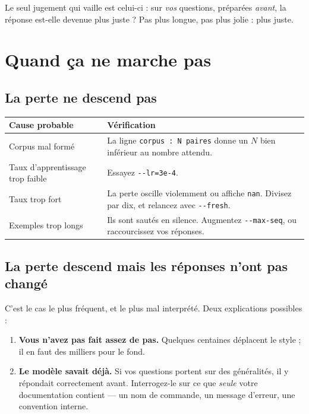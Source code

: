 \begin{nkretenir}
Le seul jugement qui vaille est celui-ci : sur \emph{vos} questions, préparées
\emph{avant}, la réponse est-elle devenue plus juste ? Pas plus longue, pas plus
jolie : plus juste.
\end{nkretenir}

\section{Quand ça ne marche pas}

\subsection{La perte ne descend pas}

\begin{center}
\begin{tabular}{p{4.6cm}p{9.0cm}}
\toprule
\textbf{Cause probable} & \textbf{Vérification} \\
\midrule
Corpus mal formé & La ligne \texttt{corpus : N paires} donne un $N$ bien
                   inférieur au nombre attendu. \\
Taux d'apprentissage trop faible & Essayez \texttt{-{}-lr=3e-4}. \\
Taux trop fort & La perte oscille violemment ou affiche \texttt{nan}. Divisez
                   par dix, et relancez avec \texttt{-{}-fresh}. \\
Exemples trop longs & Ils sont sautés en silence. Augmentez
                   \texttt{-{}-max-seq}, ou raccourcissez vos réponses. \\
\bottomrule
\end{tabular}
\end{center}

\subsection{La perte descend mais les réponses n'ont pas changé}

C'est le cas le plus fréquent, et le plus mal interprété. Deux explications
possibles :

\begin{enumerate}
  \item \textbf{Vous n'avez pas fait assez de pas.} Quelques centaines déplacent
        le style ; il en faut des milliers pour le fond.
  \item \textbf{Le modèle savait déjà.} Si vos questions portent sur des
        généralités, il y répondait correctement avant. Interrogez-le sur ce
        que \emph{seule} votre documentation contient — un nom de commande, un
        message d'erreur, une convention interne.
\end{enumerate}

